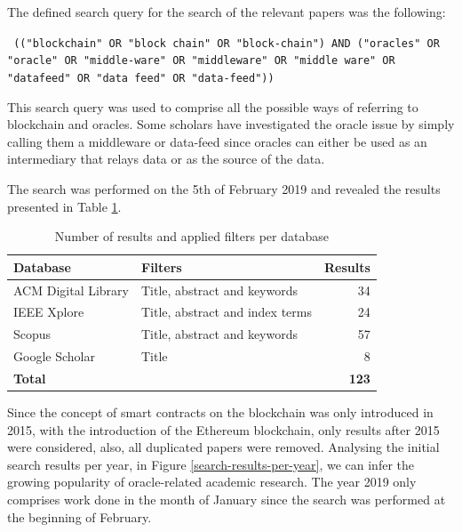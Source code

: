 The defined search query for the search of the relevant papers was the following:

\texttt{
  (("blockchain" OR "block chain" OR "block-chain")
  AND
  ("oracles" OR "oracle" OR "middle-ware" OR "middleware" OR "middle ware" OR "datafeed" OR "data feed" OR "data-feed"))
}


This search query was used to comprise all the possible ways of referring to blockchain and oracles. Some scholars have investigated the oracle issue by simply calling them a middleware or data-feed since oracles can either be used as an intermediary that relays data or as the source of the data.

The search was performed on the 5th of February 2019 and revealed the results presented in Table \ref{search-results-table}.

\begin{table}[H]
  \centering
  \begin{tabular}{llr}
    \hline
    \textbf{Database}   & \textbf{Filters}                & \textbf{Results} \\ \hline
    ACM Digital Library & Title, abstract and keywords    & 34               \\
    IEEE Xplore         & Title, abstract and index terms & 24               \\
    Scopus              & Title, abstract and keywords    & 57               \\
    Google Scholar      & Title                           & 8                \\ \hline
    \textbf{Total}      & \textbf{}                       & \textbf{123}     \\ \hline
  \end{tabular}
  \caption{Number of results and applied filters per database}
  \label{search-results-table}
\end{table}

Since the concept of smart contracts on the blockchain was only introduced in 2015, with the introduction of the Ethereum blockchain, only results after 2015 were considered, also, all duplicated papers were removed. Analysing the initial search results per year, in Figure \ref{search-results-per-year}, we can infer the growing popularity of oracle-related academic research. The year 2019 only comprises work done in the month of January since the search was performed at the beginning of February.

